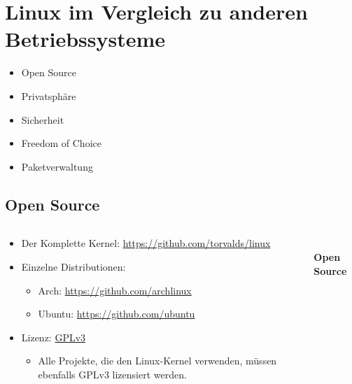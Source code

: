 \documentclass[
    ngerman,
    accentcolor=3b,
    dark_mode,
    fontsize= 12pt,
    a4paper,
    aspectratio=169,
    colorback=true,
    fancy_row_colors,
    leqno,
    fleqn,
    boxarc=3pt,
    fleqn,
]{algoslides}
\begin{document}
    \section{Linux im Vergleich zu anderen Betriebssysteme}\label{linux-vs-other-oses}\label{Linux im Vergleich zu anderen Betriebssysteme}
    \begin{frame}
        \slidehead{}
        \begin{itemize}
            \item Open Source
            \item Privatsphäre
            \item Sicherheit
            \item Freedom of Choice
            \item Paketverwaltung
        \end{itemize}
    \end{frame}
    \subsection{Open Source}
    \begin{frame}[c]
        \slidehead{}
        \begin{columns}
            \begin{column}[c]{0.5\textwidth}
                \begin{itemize}
                    \item Der Komplette Kernel: \url{https://github.com/torvalds/linux}
                    \item Einzelne Distributionen:
                        \begin{itemize}
                            \item Arch: \url{https://github.com/archlinux}
                            \item Ubuntu: \url{https://github.com/ubuntu}
                        \end{itemize}
                    \item Lizenz: \href{https://www.gnu.org/licenses/gpl-3.0.html}{GPLv3}
                        \begin{itemize}
                            \item Alle Projekte, die den Linux-Kernel verwenden, müssen ebenfalls GPLv3 lizensiert werden.
                        \end{itemize}
                \end{itemize}
            \end{column}
            \begin{column}[c]{0.5\textwidth}
                \begin{center}
                    \fontsize{50pt}{0pt}\selectfont\faOsi{}\\[0.2cm]
                    \normalsize\textbf{Open Source}
                \end{center}
            \end{column}
        \end{columns}
    \end{frame}
\end{document}
